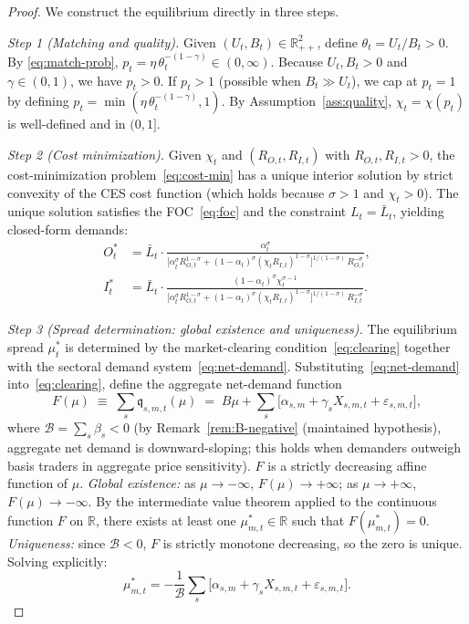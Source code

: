 \documentclass[12pt]{article}
\theoremstyle{definition}
\newcommand{\1}[1]{\mathds{1}\left[#1\right]}
\newcommand{\R}{\mathbb{R}}
\begin{document}
\begin{proof}
  We construct the equilibrium directly in three steps.

  \textit{Step 1 (Matching and quality).} Given $(U_t, B_t) \in \R_{++}^2$,
  define $\theta_t = U_t/B_t > 0$. By \eqref{eq:match-prob},
  $p_t = \eta\,\theta_t^{-(1-\gamma)} \in (0,\infty)$. Because $U_t, B_t > 0$
  and $\gamma \in (0,1)$, we have $p_t > 0$. If $p_t > 1$ (possible when
  $B_t \gg U_t$), we cap at $p_t = 1$ by defining $p_t = \min(\eta\,
  \theta_t^{-(1-\gamma)}, 1)$. By Assumption~\ref{ass:quality}, $\chi_t =
  \chi(p_t)$ is well-defined and in $(0,1]$.

  \textit{Step 2 (Cost minimization).} Given $\chi_t$ and $(R_{O,t}, R_{I,t})$
  with $R_{O,t}, R_{I,t} > 0$, the cost-minimization problem~\eqref{eq:cost-min}
  has a unique interior solution by strict convexity of the CES cost function
  (which holds because $\sigma > 1$ and $\chi_t > 0$). The unique solution
  satisfies the FOC~\eqref{eq:foc} and the constraint $L_t = \bar{L}_t$,
  yielding closed-form demands:
  \begin{align}
    O_t^* &= \bar{L}_t \cdot \frac{\alpha_t^{\sigma}}{
      \bigl[\alpha_t^{\sigma} R_{O,t}^{1-\sigma} +
      (1-\alpha_t)^{\sigma}(\chi_t R_{I,t})^{1-\sigma}\bigr]^{1/(1-\sigma)}\,
      R_{O,t}^{-\sigma}}, \label{eq:demand-O} \\
    I_t^* &= \bar{L}_t \cdot \frac{(1-\alpha_t)^{\sigma}\chi_t^{\sigma-1}}{
      \bigl[\alpha_t^{\sigma} R_{O,t}^{1-\sigma} +
      (1-\alpha_t)^{\sigma}(\chi_t R_{I,t})^{1-\sigma}\bigr]^{1/(1-\sigma)}\,
      R_{I,t}^{-\sigma}}.
      \label{eq:demand-I}
  \end{align}

  \textit{Step 3 (Spread determination: global existence and uniqueness).}
  The equilibrium spread $\mu_t^*$ is determined by the market-clearing
  condition~\eqref{eq:clearing} together with the sectoral demand
  system~\eqref{eq:net-demand}. Substituting~\eqref{eq:net-demand}
  into~\eqref{eq:clearing}, define the aggregate net-demand function
  \[
    F(\mu) \;\equiv\; \sum_s \mathfrak{q}_{s,m,t}(\mu)
    \;=\; B\mu + \sum_s \bigl[\alpha_{s,m} + \gamma_s X_{s,m,t}
    + \varepsilon_{s,m,t}\bigr],
  \]
  where $\mathcal{B} = \sum_s \beta_s < 0$ (by Remark~\ref{rem:B-negative}
  (maintained hypothesis), aggregate net demand is downward-sloping; this holds
  when demanders outweigh basis traders in aggregate price sensitivity).
  $F$ is a strictly decreasing affine function of $\mu$. \emph{Global
  existence:} as $\mu \to -\infty$, $F(\mu) \to +\infty$; as $\mu \to
  +\infty$, $F(\mu) \to -\infty$.
  By the intermediate value theorem applied to the continuous function $F$ on
  $\R$, there exists at least one $\mu_{m,t}^* \in \R$ such that $F(\mu_{m,t}^*)
  = 0$. \emph{Uniqueness:} since $\mathcal{B} < 0$, $F$ is strictly monotone
  decreasing, so the zero is unique. Solving explicitly:
  \[
    \mu_{m,t}^* = -\frac{1}{\mathcal{B}}\sum_s \bigl[\alpha_{s,m} +
    \gamma_s X_{s,m,t} + \varepsilon_{s,m,t}\bigr].
  \]


\end{proof}
\end{document}
